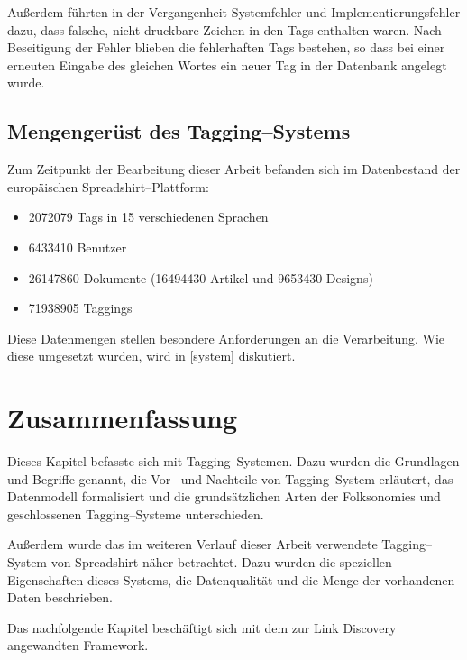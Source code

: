 Außerdem führten in der Vergangenheit Systemfehler und Implementierungsfehler dazu, dass falsche, nicht druckbare Zeichen in den Tags enthalten waren. Nach Beseitigung der Fehler blieben die fehlerhaften Tags bestehen, so dass bei einer erneuten Eingabe des gleichen Wortes ein neuer Tag in der Datenbank angelegt wurde.

\cleardoublepage

\subsection{Mengengerüst des Tagging--Systems}
\label{tag_amount}

Zum Zeitpunkt der Bearbeitung dieser Arbeit befanden sich im Datenbestand der europäischen Spreadshirt--Plattform:

\begin{itemize}
    \item \num{2072079} Tags in \num{15} verschiedenen Sprachen
    \item \num{6433410} Benutzer
    \item \num{26147860} Dokumente (\num{16494430} Artikel und \num{9653430} Designs)
    \item \num{71938905} Taggings
\end{itemize}

Diese Datenmengen stellen besondere Anforderungen an die Verarbeitung. Wie diese umgesetzt wurden, wird in \cref{system} diskutiert.

\section{Zusammenfassung}

Dieses Kapitel befasste sich mit Tagging--Systemen. Dazu wurden die Grundlagen und Begriffe genannt, die Vor-- und Nachteile von Tagging--System erläutert, das Datenmodell formalisiert und die grundsätzlichen Arten der Folksonomies und geschlossenen Tagging--Systeme unterschieden.

Außerdem wurde das im weiteren Verlauf dieser Arbeit verwendete Tagging--System von Spreadshirt \cite{sprd2013} näher betrachtet. Dazu wurden die speziellen Eigenschaften dieses Systems, die Datenqualität und die Menge der vorhandenen Daten beschrieben.

Das nachfolgende Kapitel beschäftigt sich mit dem zur Link Discovery angewandten Framework.